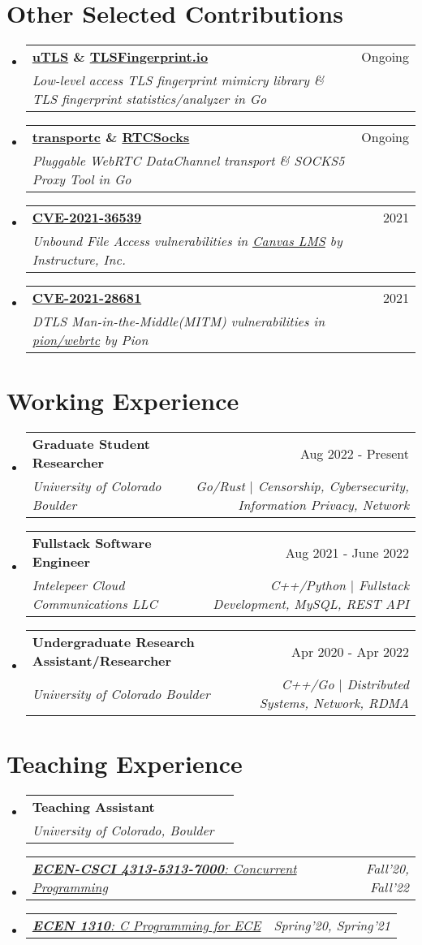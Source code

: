 \documentclass[letterpaper,11pt]{article}
\makeatletter
\newcommand{\resumeSubheading}[4]{
  \vspace{-2pt}\item
    \begin{tabular*}{0.97\textwidth}[t]{l@{\extracolsep{\fill}}r}
      \textbf{#1} & #2 \\
      \textit{\small#3} & \textit{\small #4} \\
    \end{tabular*}\vspace{-7pt}
}
\newcommand{\resumeSubSubheading}[2]{
    \item
    \begin{tabular*}{0.97\textwidth}{l@{\extracolsep{\fill}}r}
      \textit{\small#1} & \textit{\small #2} \\
    \end{tabular*}\vspace{-7pt}
}
\newcommand{\resumeSubHeadingListStart}{\begin{itemize}[leftmargin=0.15in, label={}]}
\newcommand{\resumeSubHeadingListEnd}{\end{itemize}}
\makeatother
\begin{document}
\section{Other Selected Contributions}
\resumeSubHeadingListStart
\resumeSubheading
{\href{https://github.com/refraction-networking/utls}{\textbf{uTLS}} \& \href{https://github.com/refraction-networking/tls-fingerprint}{\textbf{TLSFingerprint.io}}}{Ongoing}
{Low-level access TLS fingerprint mimicry library \& TLS fingerprint statistics/analyzer in Go}{}
\resumeSubheading
{\href{https://github.com/gaukas/transportc}{\textbf{transportc}} \& \href{https://github.com/gaukas/rtcsocks}{\textbf{RTCSocks}}}{Ongoing}
{Pluggable WebRTC DataChannel transport \& SOCKS5 Proxy Tool in Go}{}
\resumeSubheading
{\href{https://cve.mitre.org/cgi-bin/cvename.cgi?name=CVE-2021-36539}{\textbf{CVE-2021-36539}}}{2021}
{Unbound File Access vulnerabilities in \href{https://www.instructure.com/canvas}{Canvas LMS} by \emph{Instructure, Inc.}}{}
\resumeSubheading
{\href{https://cve.mitre.org/cgi-bin/cvename.cgi?name=CVE-2021-28681}{\textbf{CVE-2021-28681}}}{2021}
{DTLS Man-in-the-Middle(MITM) vulnerabilities in \href{https://github.com/pion/webrtc}{pion/webrtc} by \emph{Pion}}{}
\resumeSubHeadingListEnd
\vspace{1pt}

\section{Working Experience}
\resumeSubHeadingListStart
\resumeSubheading
{Graduate Student Researcher}{Aug 2022 - Present}
{University of Colorado Boulder}{Go/Rust $|$ Censorship, Cybersecurity, Information Privacy, Network}
\resumeSubheading
{Fullstack Software Engineer}{Aug 2021 - June 2022}
{Intelepeer Cloud Communications LLC}{C++/Python $|$ Fullstack Development, MySQL, REST API}
\resumeSubheading
{Undergraduate Research Assistant/Researcher}{Apr 2020 - Apr 2022}
{University of Colorado Boulder}{C++/Go $|$ Distributed Systems, Network, RDMA}
\resumeSubHeadingListEnd
\vspace{1pt}

\section{Teaching Experience}
\resumeSubHeadingListStart
\resumeSubheading
{Teaching Assistant}{}
{University of Colorado, Boulder}{}
\resumeSubSubheading
{\href{https://experts.colorado.edu/display/coursename_ECEN-4313}{\textbf{ECEN-CSCI 4313-5313-7000}: Concurrent Programming}}{Fall'20, Fall'22}
\resumeSubSubheading
{\href{https://experts.colorado.edu/display/coursename_ECEN-1310}{\textbf{ECEN 1310}: C Programming for ECE}}{Spring'20, Spring'21}\resumeSubHeadingListEnd
\vspace{1pt}
\end{document}
